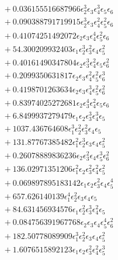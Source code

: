 \documentclass[10pt]{article}
\begin{document}
\begin{align*}
&{}  + 0.036155516687966 \epsilon_{2}^{3} \epsilon_{3} \epsilon_{4}^{3} \epsilon_{5} \epsilon_{6} \\
&{}  + 0.090388791719915 \epsilon_{2}^{3} \epsilon_{3} \epsilon_{4}^{2} \epsilon_{5}^{2} \epsilon_{6} \\
&{}  + 0.41074251492072 \epsilon_{2} \epsilon_{3} \epsilon_{4}^{4} \epsilon_{5}^{2} \epsilon_{6} \\
&{}  + 54.300209932403 \epsilon_{1} \epsilon_{2}^{3} \epsilon_{3}^{2} \epsilon_{4} \epsilon_{5}^{2} \\
&{}  + 0.40161490347804 \epsilon_{2} \epsilon_{3}^{3} \epsilon_{4}^{2} \epsilon_{5} \epsilon_{6}^{2} \\
&{}  + 0.2099350631817 \epsilon_{2} \epsilon_{3} \epsilon_{4}^{2} \epsilon_{5}^{2} \epsilon_{6}^{3} \\
&{}  + 0.4198701263634 \epsilon_{2} \epsilon_{3} \epsilon_{4}^{3} \epsilon_{5}^{2} \epsilon_{6}^{2} \\
&{}  + 0.83974025272681 \epsilon_{2} \epsilon_{3}^{4} \epsilon_{4}^{2} \epsilon_{5} \epsilon_{6} \\
&{}  + 6.8499937279479 \epsilon_{1} \epsilon_{2} \epsilon_{3}^{3} \epsilon_{4}^{3} \epsilon_{5} \\
&{}  + 1037.436764608 \epsilon_{1}^{3} \epsilon_{2}^{2} \epsilon_{3}^{2} \epsilon_{4} \epsilon_{5} \\
&{}  + 131.87767385482 \epsilon_{1}^{2} \epsilon_{2}^{3} \epsilon_{3} \epsilon_{4} \epsilon_{5}^{2} \\
&{}  + 0.26078889836236 \epsilon_{2} \epsilon_{3}^{2} \epsilon_{4} \epsilon_{5}^{3} \epsilon_{6}^{2} \\
&{}  + 136.02971351206 \epsilon_{1}^{2} \epsilon_{2} \epsilon_{3}^{2} \epsilon_{4}^{2} \epsilon_{5}^{2} \\
&{}  + 0.069897895183142 \epsilon_{1} \epsilon_{2} \epsilon_{3}^{2} \epsilon_{4} \epsilon_{5}^{4} \\
&{}  + 657.626140139 \epsilon_{1}^{4} \epsilon_{2}^{2} \epsilon_{3} \epsilon_{4} \epsilon_{5} \\
&{}  + 84.631456934576 \epsilon_{1} \epsilon_{2}^{2} \epsilon_{3}^{3} \epsilon_{4}^{2} \epsilon_{5} \\
&{}  + 0.084756391967768 \epsilon_{2} \epsilon_{3} \epsilon_{4} \epsilon_{5}^{4} \epsilon_{6}^{2} \\
&{}  + 182.50778089909 \epsilon_{1}^{3} \epsilon_{2}^{2} \epsilon_{3} \epsilon_{4} \epsilon_{5}^{2} \\
&{}  + 1.6076515892123 \epsilon_{1} \epsilon_{2} \epsilon_{3}^{2} \epsilon_{4}^{2} \epsilon_{5}^{3} \\

\end{align*}
\end{document}
